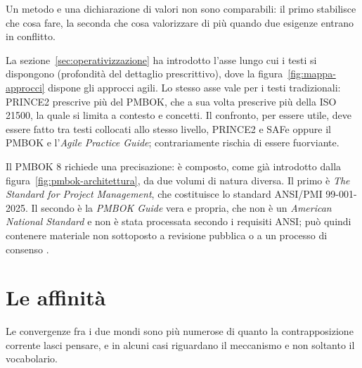 Un metodo e una dichiarazione di valori non sono comparabili: il primo
stabilisce che cosa fare, la seconda che cosa valorizzare di pi\`u quando due
esigenze entrano in conflitto.

La sezione~\ref{sec:operativizzazione} ha introdotto l'asse lungo cui i testi si
dispongono (profondit\`a del dettaglio prescrittivo), dove la
figura~\ref{fig:mappa-approcci} dispone gli approcci agili. Lo stesso asse
vale per i testi tradizionali: PRINCE2 prescrive pi\`u del PMBOK, che a sua
volta prescrive pi\`u della ISO 21500, la quale si limita a contesto e concetti.
Il confronto, per essere utile, deve essere fatto tra testi collocati allo stesso livello,
PRINCE2 e SAFe oppure il PMBOK e l'\emph{Agile Practice Guide}; contrariamente
rischia di essere fuorviante.

Il PMBOK 8 richiede una precisazione: è composto, come già introdotto dalla
figura~\ref{fig:pmbok-architettura}, da due volumi di natura diversa.
Il primo \`e \emph{The Standard for Project Management}, che costituisce lo
standard ANSI/PMI 99-001-2025. Il secondo \`e la \emph{PMBOK Guide} vera e
propria, che non \`e
un \emph{American National Standard} e non \`e stata processata secondo i
requisiti ANSI; pu\`o quindi contenere materiale non sottoposto a revisione pubblica
o a un processo di consenso \cite{pmbok8}.




\section{Le affinit\`a}

Le convergenze fra i due mondi sono pi\`u numerose di quanto la
contrapposizione corrente lasci pensare, e in alcuni casi riguardano il
meccanismo e non soltanto il vocabolario.



